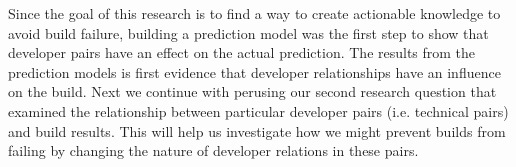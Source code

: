 Since the goal of this research is to find a way to create actionable knowledge
to avoid build failure, building a prediction model was the first step to show
that developer pairs have an effect on the actual prediction. The results from
the prediction models is first evidence that developer relationships have an
influence on the build. Next we continue with perusing our second research
question that examined the relationship between particular developer
pairs (i.e. technical pairs) and build results. This will help us
investigate how we might prevent builds from failing by changing the
nature of developer relations in these pairs.



